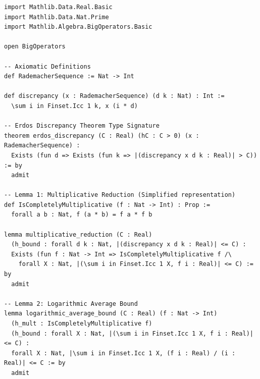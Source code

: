 \documentclass[11pt,a4paper]{article}
\begin{document}
\begin{lstlisting}[basicstyle=\ttfamily\small, breaklines=true]
import Mathlib.Data.Real.Basic
import Mathlib.Data.Nat.Prime
import Mathlib.Algebra.BigOperators.Basic

open BigOperators

-- Axiomatic Definitions
def RademacherSequence := Nat -> Int

def discrepancy (x : RademacherSequence) (d k : Nat) : Int :=
  \sum i in Finset.Icc 1 k, x (i * d)

-- Erdos Discrepancy Theorem Type Signature
theorem erdos_discrepancy (C : Real) (hC : C > 0) (x : RademacherSequence) :
  Exists (fun d => Exists (fun k => |(discrepancy x d k : Real)| > C)) := by
  admit

-- Lemma 1: Multiplicative Reduction (Simplified representation)
def IsCompletelyMultiplicative (f : Nat -> Int) : Prop :=
  forall a b : Nat, f (a * b) = f a * f b

lemma multiplicative_reduction (C : Real)
  (h_bound : forall d k : Nat, |(discrepancy x d k : Real)| <= C) :
  Exists (fun f : Nat -> Int => IsCompletelyMultiplicative f /\
    forall X : Nat, |(\sum i in Finset.Icc 1 X, f i : Real)| <= C) := by
  admit

-- Lemma 2: Logarithmic Average Bound
lemma logarithmic_average_bound (C : Real) (f : Nat -> Int)
  (h_mult : IsCompletelyMultiplicative f)
  (h_bound : forall X : Nat, |(\sum i in Finset.Icc 1 X, f i : Real)| <= C) :
  forall X : Nat, |\sum i in Finset.Icc 1 X, (f i : Real) / (i : Real)| <= C := by
  admit
\end{lstlisting}
\end{document}
